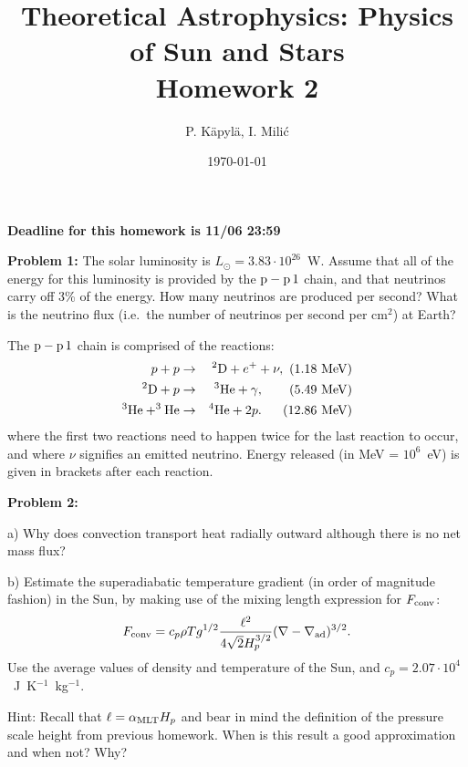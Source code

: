 \documentclass[12pt]{article}
\title{Theoretical Astrophysics: Physics of Sun and Stars\\
Homework 2}
\author{P. K\"{a}pyl\"{a}, I. Mili\'{c}}
\date{\today}
\newcommand{\Fconv}{F_{\rm conv}}
\begin{document}
\maketitle

\textbf{Deadline for this homework is \textbf{11}/06 23:59}

{\bf Problem 1:} The solar luminosity is $L_\odot = 3.83\cdot
10^{26}$~W. Assume that all of the energy for this luminosity is
provided by the ${\rm p-p\,1}$ chain, and that neutrinos carry off 3\% of the
energy. How many neutrinos are produced per second? What is the
neutrino flux (i.e.\ the number of neutrinos per second per cm$^2$) at
Earth?

The ${\rm p-p\,1}$ chain is comprised of the reactions:
\begin{eqnarray}
  p + p &\rightarrow& ^2{\rm D} + e^+ + \nu,\ (1.18~{\rm MeV})\nonumber \\
  ^2{\rm D} + p &\rightarrow& ^3{\rm He} + \gamma,\ \ \ \ \ \ (5.49~{\rm MeV}) \nonumber \\
  ^3{\rm He} + ^3{\rm He} &\rightarrow& ^4{\rm He} + 2p.\ \ \ \ \ (12.86~{\rm MeV})
\end{eqnarray}
where the first two reactions need to happen twice for the last
reaction to occur, and where $\nu$ signifies an emitted
neutrino. Energy released (in MeV = $10^6$~eV) is given in brackets
after each reaction.


{\bf Problem 2:} 

a) Why does convection transport heat radially outward although there
is no net mass flux?

b) Estimate the superadiabatic temperature gradient (in order of
magnitude fashion) in the Sun, by making use of the mixing length
expression for $\Fconv$:
\begin{equation}
  \Fconv = c_p \rho T g^{1/2} \frac{\ell^2}{4\sqrt{2}H_p^{3/2}} (\nabla-\nabla_{\rm ad})^{3/2}.
\end{equation}
Use the average values of density and temperature of the Sun, and $c_p
= 2.07\cdot10^4$~J~K$^{-1}$~kg$^{-1}$. 

Hint: Recall that $\ell =
\alpha_{\rm MLT}H_p$ and bear in mind the definition of the pressure
scale height from previous homework. When is this result a good
approximation and when not? Why?
\end{document}
